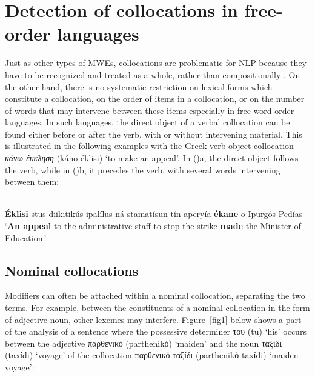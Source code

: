 \documentclass[output=paper]{langsci/langscibook}
\begin{document}
\section{Detection of collocations in free-order languages}
\label{sec4}
Just as other types of MWEs, collocations are problematic for NLP because they have to be recognized and treated as a whole, rather than compositionally \citep{sag02}. On the other hand, there is no systematic restriction on lexical forms which constitute a collocation, on the order of items in a collocation, or on the number of words that may intervene between these items especially in free word order languages. In such languages, the direct object of a verbal collocation can be found either before
or after the verb, with or without intervening material. This is illustrated in the following examples with the Greek verb-object collocation {\em κάνω έκκληση} (káno éklisi)
`to make an appeal'. 
In ()a, the direct object 
follows the verb, while in ()b, it precedes the verb, with several words intervening between them:

\vspace*{3mm}

 \\ 
\textbf{Éklisi} stus diikitikús ipalílus ná stamatísun tín aperyía \textbf{ékane} o Ιpurgós Pedías\\
`\textbf{An appeal} to the administrative staff to stop the strike \textbf{made} the Minister of Education.'
\finex



\subsection{ Nominal collocations}
Modifiers can often be attached within a nominal collocation, separating the two terms. For example, between the constituents of a nominal collocation in the form of adjective-noun, other lexemes may interfere. Figure~\ref{fig1} below shows a part of the analysis of a sentence where the possessive determiner {του} (tu) `his' occurs between the adjective  {παρθενικό} (parthenikό) `maiden' and the noun {ταξίδι} (taxίdi) `voyage' of the collocation {παρθενικό ταξίδι} (parthenikό taxίdi) `maiden voyage':
\end{document}
